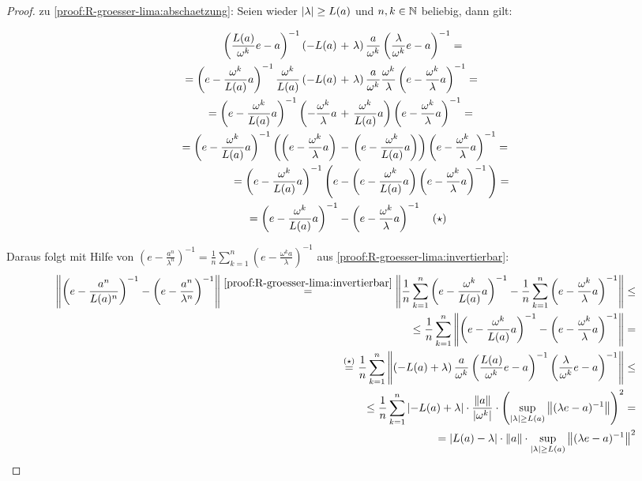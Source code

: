 \begin{proof}
zu \ref{proof:R-groesser-lima:abschaetzung}: Seien wieder $|\lambda| \geq L(a)$ und $n,k \in \mathbb{N}$ beliebig, dann gilt:

\begin{align*}
\left(\frac{L(a)}{\omega^k}e-a\right)^{-1} 
	\left(-L(a)\right. &+ \left.\lambda\right)\frac{a}{\omega^k} 
	\left(\frac{\lambda}{\omega^k}e - a\right)^{-1} = \\
= \left(e-\frac{\omega^k}{L(a)}a\right)^{-1} 
	\frac{\omega^k}{L(a)} \left(-L(a)\right. &+ \left.\lambda\right)\frac{a}{\omega^k} \frac{\omega^k}{\lambda}
	\left(e - \frac{\omega^k}{\lambda}a\right)^{-1} = \\
= \left(e-\frac{\omega^k}{L(a)}a\right)^{-1} 
	\left(-\frac{\omega^k}{\lambda}a \right.&+\left. \frac{\omega^k}{L(a)}a\right)
	\left(e - \frac{\omega^k}{\lambda}a\right)^{-1} = \\
= \left(e-\frac{\omega^k}{L(a)}a\right)^{-1} 
	\left(\left(e -\frac{\omega^k}{\lambda}a\right) \right.&-\left. \left(e - \frac{\omega^k}{L(a)}a\right)\right)
	\left(e - \frac{\omega^k}{\lambda}a\right)^{-1} = \\	
= \left(e-\frac{\omega^k}{L(a)}a\right)^{-1} 
	\Bigg(e &- \left(e - \frac{\omega^k}{L(a)}a\right)\left(e - \frac{\omega^k}{\lambda}a\right)^{-1}\Bigg)
	 = \\
= \left(e-\frac{\omega^k}{L(a)}a\right)^{-1} &- \left(e - \frac{\omega^k}{\lambda}a\right)^{-1} \quad (\star)
\end{align*}

Daraus folgt mit Hilfe von $\left(e - \frac{a^n}{\lambda^n}\right)^{-1} = \frac{1}{n}\sum_{k=1}^n \left(e-\frac{\omega^k a}{\lambda}\right)^{-1}$ aus \ref{proof:R-groesser-lima:invertierbar}:
\begin{align*}
\left\lVert\left(e-\frac{a^n}{L(a)^n}\right)^{-1} - \left(e - \frac{a^n}{\lambda^n}\right)^{-1}\right\rVert 
	\overset{\ref{proof:R-groesser-lima:invertierbar}}{=} \left\lVert\frac{1}{n}\sum_{k=1}^n\left(e-\frac{\omega^k}{L(a)}a\right)^{-1} - \frac{1}{n}\sum_{k=1}^n\left(e - \frac{\omega^k}{\lambda}a\right)^{-1}\right\rVert \leq \\
	\leq \frac{1}{n}\sum_{k=1}^n \left\lVert\left(e-\frac{\omega^k}{L(a)}a\right)^{-1} - \left(e - \frac{\omega^k}{\lambda}a\right)^{-1}\right\rVert = \\
	\overset{(\star)}{=} \frac{1}{n}\sum_{k=1}^n \left\lVert\left(-L(a) + \lambda\right)\frac{a}{\omega^k} \left(\frac{L(a)}{\omega^k}e-a\right)^{-1} \left(\frac{\lambda}{\omega^k}e - a\right)^{-1}\right\rVert \leq \\
	\leq \frac{1}{n}\sum_{k=1}^n \left|-L(a) + \lambda\right| \cdot \frac{\left\lVert a\right\rVert}{\left|\omega^k\right|} \cdot \left(\underset{|\lambda| \geq L(a)}{\sup}\left\lVert(\lambda e - a)^{-1}\right\rVert\right)^2 = \\
	= \left|L(a) - \lambda\right| \cdot \left\lVert a\right\rVert \cdot \underset{|\lambda| \geq L(a)}{\sup}\left\lVert(\lambda e - a)^{-1}\right\rVert^2	
\end{align*}


\end{proof}
